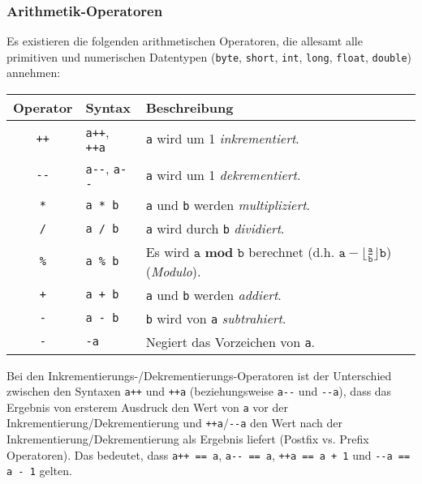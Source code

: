 	\subsubsection{Arithmetik-Operatoren}
		Es existieren die folgenden arithmetischen Operatoren, die allesamt alle primitiven und numerischen Datentypen (\lstinline|byte|, \lstinline|short|, \lstinline|int|, \lstinline|long|, \lstinline|float|, \lstinline|double|) annehmen:
		\begin{table}[H]
			\centering
			\begin{tabular}{c | l | l}
				\textbf{Operator} & \textbf{Syntax}                & \textbf{Beschreibung}                                    \\ \hline
				\texttt{++}       & \texttt{a++}, \texttt{++a}     & \texttt{a} wird um 1 \textit{inkrementiert}.             \\
				\texttt{-{}-}     & \texttt{a-{}-}, \texttt{a-{}-} & \texttt{a} wird um 1 \textit{dekrementiert}.             \\
				\texttt{*}        & \texttt{a * b}                 & \texttt{a} und \texttt{b} werden \textit{multipliziert}. \\
				\texttt{/}        & \texttt{a / b}                 & \texttt{a} wird durch \texttt{b} \textit{dividiert}.     \\
				\texttt{\%}       & \texttt{a \% b}                & Es wird \( \texttt{a} \textbf{ mod } \texttt{b} \) berechnet (d.h. \( \texttt{a} - \big\lfloor \frac{\texttt{a}}{\texttt{b}} \big\rfloor \texttt{b} \)) (\textit{Modulo}). \\
				\texttt{+}        & \texttt{a + b}                 & \texttt{a} und \texttt{b} werden \textit{addiert}.       \\
				\texttt{-}        & \texttt{a - b}                 & \texttt{b} wird von \texttt{a} \textit{subtrahiert}.     \\
				\texttt{-}        & \texttt{-a}                    & Negiert das Vorzeichen von \texttt{a}.
			\end{tabular}
		\end{table}
		Bei den Inkrementierungs-/Dekrementierungs-Operatoren ist der Unterschied zwischen den Syntaxen \texttt{a++} und \texttt{++a} (beziehungsweise \texttt{a-{}-} und \texttt{-{}-a}), dass das Ergebnis von ersterem Ausdruck den Wert von \texttt{a} vor der Inkrementierung/Dekrementierung und \texttt{++a}/\texttt{-{}-a} den Wert nach der Inkrementierung/Dekrementierung als Ergebnis liefert (Postfix vs. Prefix Operatoren). Das bedeutet, dass \texttt{a++ == a}, \texttt{a-{}- == a}, \texttt{++a == a + 1} und \texttt{-{}-a == a - 1} gelten.
		
